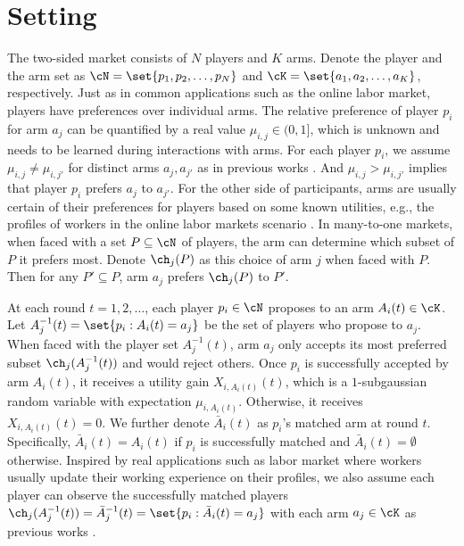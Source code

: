 \section{Setting}\label{sec:setting}

 




The two-sided market consists of $N$ players and $K$ arms. Denote the player and the arm set as $\cN = \set{p_1,p_2,\ldots,p_N}$ and $\cK=\set{a_1,a_2,\ldots,a_K}$, respectively. 
Just as in common applications such as the online labor market, players have preferences over individual arms.  
The relative preference of player $p_i$ for arm $a_j$ can be quantified by a real value $\mu_{i,j}\in (0,1]$, which is unknown and needs to be learned during interactions with arms.
For each player $p_i$, we assume $\mu_{i,j}\neq\mu_{i,j'}$ for distinct arms $a_j,a_{j'}$ as in previous works \cite{kelso1982job,roth1984stability,liu2020competing,liu2021bandit,kong2023player,wang2022bandit}. 
And $\mu_{i,j}>\mu_{i,j'}$ implies that player $p_i$ prefers $a_j$ to $a_{j'}$. 
For the other side of participants, arms are usually certain of their preferences for players based on some known utilities, e.g., the profiles of workers in the online labor markets scenario \cite{liu2020competing,liu2021bandit,zhang2022matching,kong2023player,wang2022bandit}. In many-to-one markets, when faced with a set $P \subseteq \cN$ of players, the arm can determine which subset of $P$ it prefers most. Denote $\ch_j(P)$ as this choice of arm $j$ when faced with $P$. Then for any $P' \subseteq P$, arm $a_j$ prefers $\ch_j(P)$ to $P'$. 




At each round $t=1,2,\ldots$, each player $p_i \in \cN$ proposes to an arm $A_i(t) \in \cK$. Let $A^{-1}_j(t) = \set{p_i: A_i(t)=a_j}$ be the set of players who propose to $a_j$. When faced with the player set $A^{-1}_j(t)$, arm $a_j$ only accepts its most preferred subset $\ch_j(A^{-1}_j(t))$ and would reject others. 
Once $p_i$ is successfully accepted by arm $A_i(t)$, it receives a utility gain $X_{i,A_i(t)}(t)$, which is a $1$-subgaussian random variable with expectation $\mu_{i,A_i(t)}$. 
Otherwise, it receives  $X_{i,A_i(t)}(t)=0$. 
We further denote $\bar{A}_i(t)$ as $p_i$'s matched arm at round $t$. Specifically, $\bar{A}_i(t)=A_i(t)$ if $p_i$ is successfully matched and $\bar{A}_{i}(t) = \emptyset$ otherwise. 
Inspired by real applications such as labor market where workers usually update their working experience on their profiles, we also assume each player can observe the successfully matched players $\ch_j(A^{-1}_j(t)) = \bar{A}_{j}^{-1}(t) = \set{p_i: \bar{A}_i(t)=a_j}$ with each arm $a_j \in \cK$ as previous works \cite{liu2021bandit,kong2022thompson,ghosh2022nonstationary,kong2023player,wang2022bandit}.


